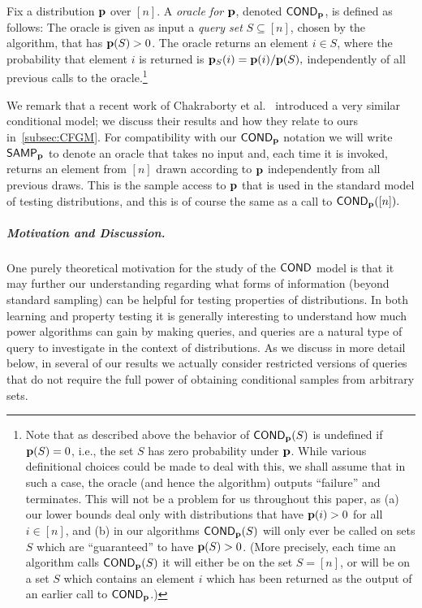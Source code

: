\begin{definition} \label{def:cond}
Fix a distribution $\mathbf{p}$ over $[n]$.  A \emph{\COND oracle for $\mathbf{p}$}, denoted
${\sf COND}_{\mathbf{p}}$, is defined as follows:
 The oracle is given as input a \emph{query set}
 $S \subseteq [n]$, chosen by the algorithm, that has $\mathbf{p}(S) > 0$. The oracle returns an element $i \in S$, where
 the probability that element $i$ is returned is $\mathbf{p}_S(i) = \mathbf{p}(i)/\mathbf{p}(S),$
 independently of all previous calls to the oracle.\footnote{Note that
as described above the behavior of ${\sf COND}_{\mathbf{p}}(S)$ is undefined if $\mathbf{p}(S)=0$,
i.e., the set $S$ has zero probability under $\mathbf{p}$.  While various definitional choices could be made to deal with this,
{we shall assume that in such a case, the oracle (and hence the algorithm)
outputs ``failure'' and terminates. This will not be a problem
for us throughout this paper, as}
(a)  our lower bounds  deal only with distributions that have
$\mathbf{p}(i)>0$ for all $i \in [n]$, and (b) in  our algorithms ${\sf COND}_{\mathbf{p}}(S)$ will only ever be
called on sets $S$ which are ``guaranteed'' to have $\mathbf{p}(S)>0$.  (More precisely, each time
an algorithm calls ${\sf COND}_{\mathbf{p}}(S)$ it will either be on the set $S=[n]$, or
will be on a set $S$ which contains an element $i$ which
has been returned as the output of an earlier call to ${\sf COND}_{\mathbf{p}}$.)}
\end{definition}

We remark that a recent work of Chakraborty et al.~\cite{CFGM:13} introduced a very similar conditional model; we discuss their results and how
they relate to ours in~\cref{subsec:CFGM}.
For compatibility with our ${\sf COND}_{\mathbf{p}}$ notation we will write ${\sf SAMP}_{\mathbf{p}}$ to
denote an oracle that takes no input and, each time it is invoked, returns
an element from $[n]$ drawn according to $\mathbf{p}$ independently from
all previous draws.  This is the sample access to
$\mathbf{p}$ that is used in the standard model of testing distributions, and
this is of course the same as a call to ${\sf COND}_{\mathbf{p}}([n]).$

\subparagraph{Motivation and Discussion.}
One purely theoretical motivation for the study of the ${\sf COND}$ model
is that it may further our understanding regarding what forms of information
(beyond standard sampling) can be helpful for testing properties of
distributions.  In both learning and property testing
it is generally interesting to understand how much power algorithms
can gain by making queries,
        and \COND queries are a natural type of query to investigate
in the context of distributions. As we discuss in more detail below,
in several of our results we actually consider restricted versions of \COND
queries that do not require the full power of obtaining conditional samples
from arbitrary sets.

